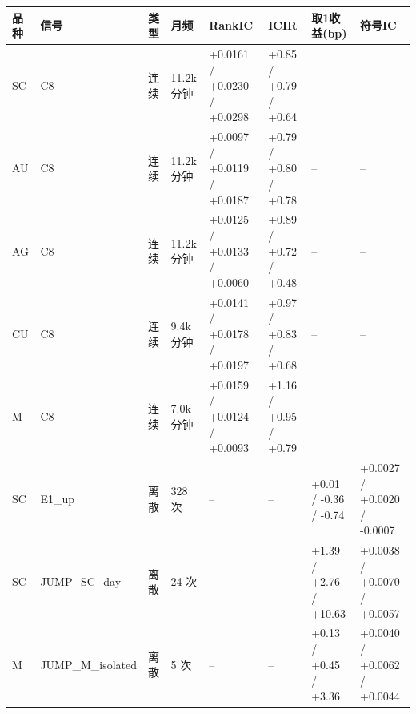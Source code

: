 \setlength{\tabcolsep}{2pt}
\begin{tabular}{llllllll}
\toprule
品种 & 信号 & 类型 & 月频 & RankIC & ICIR & 取1收益(bp) & 符号IC \\
\midrule
SC & C8 & 连续 & 11.2k 分钟 & +0.0161 / +0.0230 / +0.0298 & +0.85 / +0.79 / +0.64 & -- & -- \\
AU & C8 & 连续 & 11.2k 分钟 & +0.0097 / +0.0119 / +0.0187 & +0.79 / +0.80 / +0.78 & -- & -- \\
AG & C8 & 连续 & 11.2k 分钟 & +0.0125 / +0.0133 / +0.0060 & +0.89 / +0.72 / +0.48 & -- & -- \\
CU & C8 & 连续 & 9.4k 分钟 & +0.0141 / +0.0178 / +0.0197 & +0.97 / +0.83 / +0.68 & -- & -- \\
M & C8 & 连续 & 7.0k 分钟 & +0.0159 / +0.0124 / +0.0093 & +1.16 / +0.95 / +0.79 & -- & -- \\
SC & E1\_up & 离散 & 328 次 & -- & -- & +0.01 / -0.36 / -0.74 & +0.0027 / +0.0020 / -0.0007 \\
SC & JUMP\_SC\_day & 离散 & 24 次 & -- & -- & +1.39 / +2.76 / +10.63 & +0.0038 / +0.0070 / +0.0057 \\
M & JUMP\_M\_isolated & 离散 & 5 次 & -- & -- & +0.13 / +0.45 / +3.36 & +0.0040 / +0.0062 / +0.0044 \\
\bottomrule
\end{tabular}
